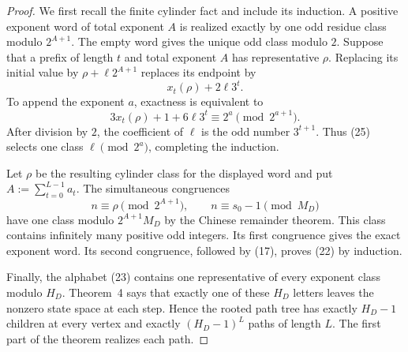 \documentclass[11pt]{article}
\begin{document}
\begin{proof}
We first recall the finite cylinder fact and include its induction.  A
positive exponent word of total exponent $A$ is realized exactly by one odd
residue class modulo $2^{A+1}$.  The empty word gives the unique odd class
modulo $2$.  Suppose that a prefix of length $t$ and total exponent $A$ has
representative $\rho$.  Replacing its initial value by
$\rho+\ell2^{A+1}$ replaces its endpoint by
\[
  x_t(\rho)+2\ell3^t.
  \tag{24}
\]
To append the exponent $a$, exactness is equivalent to
\[
  3x_t(\rho)+1+6\ell3^t\equiv2^a\pmod {2^{a+1}}.
  \tag{25}
\]
After division by $2$, the coefficient of $\ell$ is the odd number
$3^{t+1}$.  Thus (25) selects one class $\ell\pmod {2^a}$, completing the
induction.

Let $\rho$ be the resulting cylinder class for the displayed word and put
$A:=\sum_{t=0}^{L-1}a_t$.  The simultaneous congruences
\[
  n\equiv\rho\pmod {2^{A+1}},
  \qquad
  n\equiv s_0-1\pmod {M_D}
  \tag{26}
\]
have one class modulo $2^{A+1}M_D$ by the Chinese remainder theorem.  This
class contains infinitely many positive odd integers.  Its first congruence
gives the exact exponent word.  Its second congruence, followed by (17),
proves (22) by induction.

Finally, the alphabet (23) contains one representative of every exponent
class modulo $H_D$.  Theorem~4 says that exactly one of these $H_D$ letters
leaves the nonzero state space at each step.  Hence the rooted path tree has
exactly $H_D-1$ children at every vertex and exactly $(H_D-1)^L$ paths of
length $L$.  The first part of the theorem realizes each path.
\end{proof}
\end{document}
